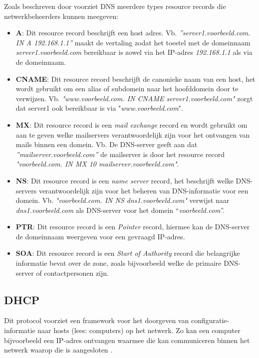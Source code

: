Zoals beschreven door \textcite{Mockapetris1987} voorziet DNS meerdere types resource records die netwerkbeheerders kunnen meegeven: 
\begin{itemize}
    \item \textbf{A}: Dit resource record beschrijft een host adres. 
    Vb. \textit{”server1.voorbeeld.com. IN A 192.168.1.1”} maakt de vertaling zodat het toestel met de domeinnaam \textit{server1.voorbeeld.com} bereikbaar is zowel via het IP-adres \textit{192.168.1.1} als via de domeinnaam. 
    \item \textbf{CNAME}: Dit resource record beschrijft de canonieke naam van een host, het wordt gebruikt om een alias of subdomein naar het hoofddomein door te verwijzen. Vb. \textit{"www.voorbeeld.com. IN CNAME server1.voorbeeld.com"} zorgt dat server1 ook bereikbaar is via "\textit{www.voorbeeld.com}".
    \item \textbf{MX}: Dit resource record is een \textit{mail exchange} record en wordt gebruikt om aan te geven welke mailservers verantwoordelijk zijn voor het ontvangen van mails binnen een domein. Vb. De DNS-server geeft aan dat \\\textit{”mailserver.voorbeeld.com”} de mailserver is door het resource record \\\textit{"voorbeeld.com. IN MX 10 mailserver.voorbeeld.com"}.
    \item \textbf{NS}: Dit resource record is een \textit{name server} record, het beschrijft welke DNS-servers verantwoordelijk zijn voor het beheren van DNS-informatie voor een domein. Vb. \textit{"voorbeeld.com. IN NS dns1.voorbeeld.com"} verwijst naar \\\textit{dns1.voorbeeld.com} als DNS-server voor het domein “\textit{voorbeeld.com}”.
    \item \textbf{PTR}: Dit resource record is een \textit{Pointer} record, hiermee kan de DNS-server de domeinnaam weergeven voor een gevraagd IP-adres.
    \item \textbf{SOA}: Dit resource record is een \textit{Start of Authority} record die belangrijke informatie bevat over de zone, zoals bijvoorbeeld welke de primaire DNS-server of contactpersonen zijn.
\end{itemize}

\subsection{DHCP}
Dit protocol voorziet een framework voor het doorgeven van configuratie-informatie naar hosts (lees: computers) op het netwerk. Zo kan een computer bijvoorbeeld een IP-adres ontvangen waarmee die kan communiceren binnen het netwerk waar\-op die is aangesloten \autocite{Droms1997}.

